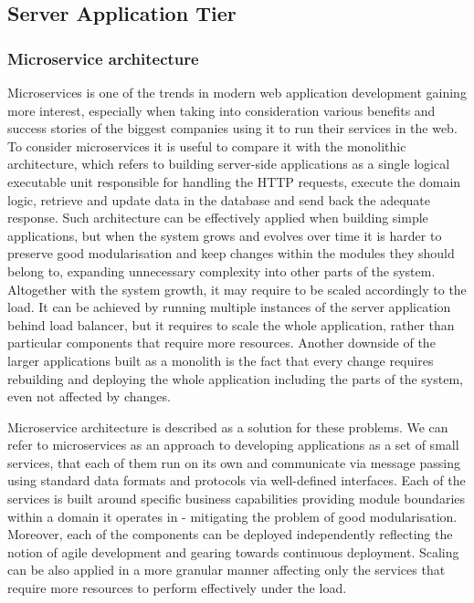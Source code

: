 \subsection*{Server Application Tier}


\subsubsection*{Microservice architecture}


Microservices is one of the trends in modern web application development gaining more interest, especially when taking into consideration various benefits and success stories of the biggest companies using it to run their services in the web. To consider microservices it is useful to compare it with the monolithic architecture, which refers to building server-side applications as a single logical executable unit responsible for handling the HTTP requests, execute the domain logic, retrieve and update data in the database and send back the adequate response. Such architecture can be effectively applied when building simple applications, but when the system grows and evolves over time it is harder to preserve good modularisation and keep changes within the modules they should belong to, expanding unnecessary complexity into other parts of the system. Altogether with the system growth, it may require to be scaled accordingly to the load. It can be achieved by running multiple instances of the server application behind load balancer, but it requires to scale the whole application, rather than particular components that require more resources. Another downside of the larger applications built as a monolith is the fact that every change requires rebuilding and deploying the whole application including the parts of the system, even not affected by changes.

Microservice architecture is described as a solution for these problems. We can refer to microservices as an approach to developing applications as a set of small services, that each of them run on its own and communicate via message passing using standard data formats and protocols via well-defined interfaces. Each of the services is built around specific business capabilities providing module boundaries within a domain it operates in - mitigating the problem of good modularisation. Moreover, each of the components can be deployed independently reflecting the notion of agile development and gearing towards continuous deployment. Scaling can be also applied in a more granular manner affecting only the services that require more resources to perform effectively under the load. \cite{FowlerMicroservices}

